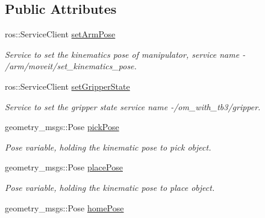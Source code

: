 \subsection*{Public Attributes}
\begin{DoxyCompactItemize}
\item 
ros\+::\+Service\+Client \hyperlink{classPickPlace_a62ec3dceec9d5fa49bb4892dfcbe19a3}{set\+Arm\+Pose}\hypertarget{classPickPlace_a62ec3dceec9d5fa49bb4892dfcbe19a3}{}\label{classPickPlace_a62ec3dceec9d5fa49bb4892dfcbe19a3}

\begin{DoxyCompactList}\small\item\em Service to set the kinematics pose of manipulator, service name -\/ /arm/moveit/set\+\_\+kinematics\+\_\+pose. \end{DoxyCompactList}\item 
ros\+::\+Service\+Client \hyperlink{classPickPlace_a8ce1ca75a49fc54a7e6f3a22c779d7f7}{set\+Gripper\+State}\hypertarget{classPickPlace_a8ce1ca75a49fc54a7e6f3a22c779d7f7}{}\label{classPickPlace_a8ce1ca75a49fc54a7e6f3a22c779d7f7}

\begin{DoxyCompactList}\small\item\em Service to set the gripper state service name -\//om\+\_\+with\+\_\+tb3/gripper. \end{DoxyCompactList}\item 
geometry\+\_\+msgs\+::\+Pose \hyperlink{classPickPlace_aa8e8f492fae90f1eab4b549f458aeac5}{pick\+Pose}\hypertarget{classPickPlace_aa8e8f492fae90f1eab4b549f458aeac5}{}\label{classPickPlace_aa8e8f492fae90f1eab4b549f458aeac5}

\begin{DoxyCompactList}\small\item\em Pose variable, holding the kinematic pose to pick object. \end{DoxyCompactList}\item 
geometry\+\_\+msgs\+::\+Pose \hyperlink{classPickPlace_a64a3f58ff3e97bdb94da81e4c55813ae}{place\+Pose}\hypertarget{classPickPlace_a64a3f58ff3e97bdb94da81e4c55813ae}{}\label{classPickPlace_a64a3f58ff3e97bdb94da81e4c55813ae}

\begin{DoxyCompactList}\small\item\em Pose variable, holding the kinematic pose to place object. \end{DoxyCompactList}\item 
geometry\+\_\+msgs\+::\+Pose \hyperlink{classPickPlace_aeb92091bd67ab116d4793fa63c146ac5}{home\+Pose}\hypertarget{classPickPlace_aeb92091bd67ab116d4793fa63c146ac5}{}\label{classPickPlace_aeb92091bd67ab116d4793fa63c146ac5}


\end{DoxyCompactItemize}
